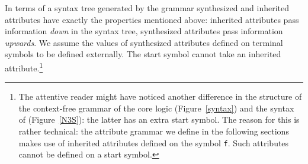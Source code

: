 
In terms of a syntax tree generated by the grammar synthesized and inherited attributes have exactly the properties mentioned above:  
inherited attributes pass information \emph{down} in the syntax tree, synthesized attributes pass information \emph{upwards}.
We assume the values of synthesized attributes defined on terminal symbols to be defined externally. The start symbol cannot take an inherited attribute.\footnote{The attentive
reader might have noticed another difference in the structure of the context-free grammar of the core logic (Figure~\ref{syntax}) and the syntax of \nthree (Figure~\ref{N3S}):
the latter has an extra start symbol. The reason for this is rather technical: the attribute grammar we define in the following sections makes use of inherited attributes
defined on the symbol \texttt{f}. Such attributes cannot be defined on a start symbol.
} 


